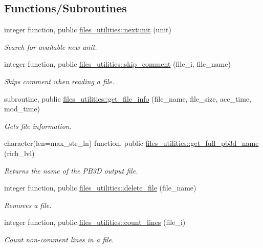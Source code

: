 \subsection*{Functions/\+Subroutines}
\begin{DoxyCompactItemize}
\item 
integer function, public \hyperlink{namespacefiles__utilities_ac6066df405564ba2f5e3c4bba726c1f8}{files\+\_\+utilities\+::nextunit} (unit)
\begin{DoxyCompactList}\small\item\em Search for available new unit. \end{DoxyCompactList}\item 
integer function, public \hyperlink{namespacefiles__utilities_ac5befac3b753b28003e6878bec2af381}{files\+\_\+utilities\+::skip\+\_\+comment} (file\+\_\+i, file\+\_\+name)
\begin{DoxyCompactList}\small\item\em Skips comment when reading a file. \end{DoxyCompactList}\item 
subroutine, public \hyperlink{namespacefiles__utilities_a07f2e430ff33c1e291731ad64c1fe482}{files\+\_\+utilities\+::get\+\_\+file\+\_\+info} (file\+\_\+name, file\+\_\+size, acc\+\_\+time, mod\+\_\+time)
\begin{DoxyCompactList}\small\item\em Gets file information. \end{DoxyCompactList}\item 
character(len=max\+\_\+str\+\_\+ln) function, public \hyperlink{namespacefiles__utilities_a43f1c2b7e128b1b2cdbcdb8963daab0e}{files\+\_\+utilities\+::get\+\_\+full\+\_\+pb3d\+\_\+name} (rich\+\_\+lvl)
\begin{DoxyCompactList}\small\item\em Returns the name of the P\+B3D output file. \end{DoxyCompactList}\item 
integer function, public \hyperlink{namespacefiles__utilities_a083c08dfd3919fa2a1df01507fe431af}{files\+\_\+utilities\+::delete\+\_\+file} (file\+\_\+name)
\begin{DoxyCompactList}\small\item\em Removes a file. \end{DoxyCompactList}\item 
integer function, public \hyperlink{namespacefiles__utilities_a3ec80c9937d23aba0d8da951ea292a83}{files\+\_\+utilities\+::count\+\_\+lines} (file\+\_\+i)
\begin{DoxyCompactList}\small\item\em Count non-\/comment lines in a file. \end{DoxyCompactList}\end{DoxyCompactItemize}
